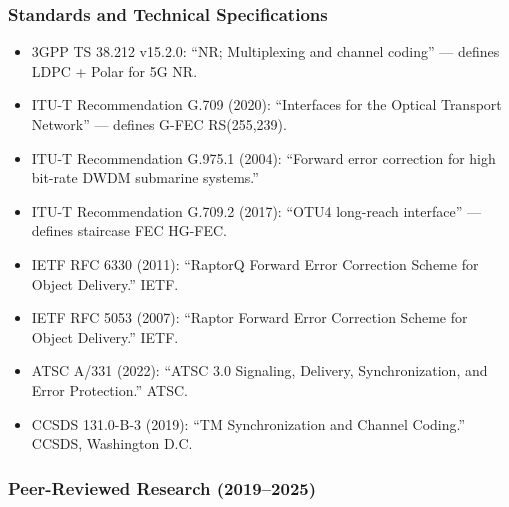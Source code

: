 \documentclass[11pt,letterpaper]{article}
\begin{document}
\subsubsection{Standards and Technical Specifications}

\begin{itemize}[leftmargin=*]
  \item 3GPP TS 38.212 v15.2.0: ``NR; Multiplexing and channel coding'' --- defines LDPC + Polar for 5G NR.
  \item ITU-T Recommendation G.709 (2020): ``Interfaces for the Optical Transport Network'' --- defines G-FEC RS(255,239).
  \item ITU-T Recommendation G.975.1 (2004): ``Forward error correction for high bit-rate DWDM submarine systems.''
  \item ITU-T Recommendation G.709.2 (2017): ``OTU4 long-reach interface'' --- defines staircase FEC HG-FEC.
  \item IETF RFC 6330 (2011): ``RaptorQ Forward Error Correction Scheme for Object Delivery.'' IETF.
  \item IETF RFC 5053 (2007): ``Raptor Forward Error Correction Scheme for Object Delivery.'' IETF.
  \item ATSC A/331 (2022): ``ATSC 3.0 Signaling, Delivery, Synchronization, and Error Protection.'' ATSC.
  \item CCSDS 131.0-B-3 (2019): ``TM Synchronization and Channel Coding.'' CCSDS, Washington D.C.
\end{itemize}

\subsubsection{Peer-Reviewed Research (2019--2025)}
\end{document}
